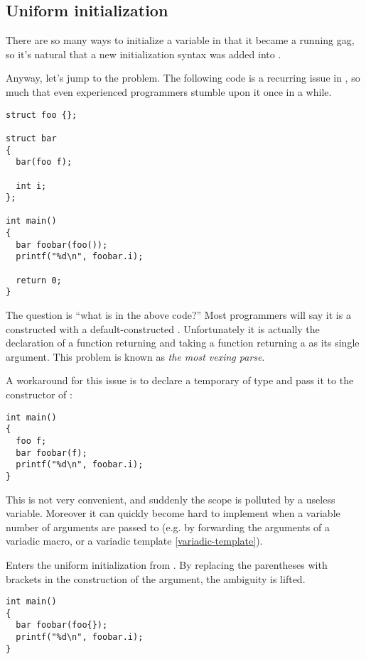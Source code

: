 \subsection{Uniform initialization}
\label{uniform-initialization}

There are so many ways to initialize a variable in \cpp{} that it
became a running gag, so it's natural that a new initialization syntax
was added into .

Anyway, let's jump to the problem. The following code is a recurring
issue in \cpp{}, so much that even experienced programmers stumble
upon it once in a while.

\begin{lstlisting}
struct foo {};

struct bar
{
  bar(foo f);

  int i;
};

int main()
{
  bar foobar(foo());
  printf("%d\n", foobar.i);

  return 0;
}
\end{lstlisting}

The question is ``what is  in the above code?'' Most
\cpp{} programmers will say it is a  constructed with a
default-constructed . Unfortunately it is actually the
declaration of a function returning  and taking a function
returning a  as its single argument. This problem is known
as \emph{the most vexing parse}.

A workaround for this issue is to declare a temporary of type
 and pass it to the constructor of :

\begin{lstlisting}
int main()
{
  foo f;
  bar foobar(f);
  printf("%d\n", foobar.i);
}
\end{lstlisting}

This is not very convenient, and suddenly the scope is polluted by a
useless variable. Moreover it can quickly become hard to implement
when a variable number of arguments are passed to 
(e.g. by forwarding the arguments of a variadic macro, or a variadic
template \ref{variadic-template}).

\bigskip

Enters the uniform initialization from . By replacing the
parentheses with brackets in the construction of the argument, the
ambiguity is lifted.

\begin{lstlisting}
int main()
{
  bar foobar(foo{});
  printf("%d\n", foobar.i);
}
\end{lstlisting}

